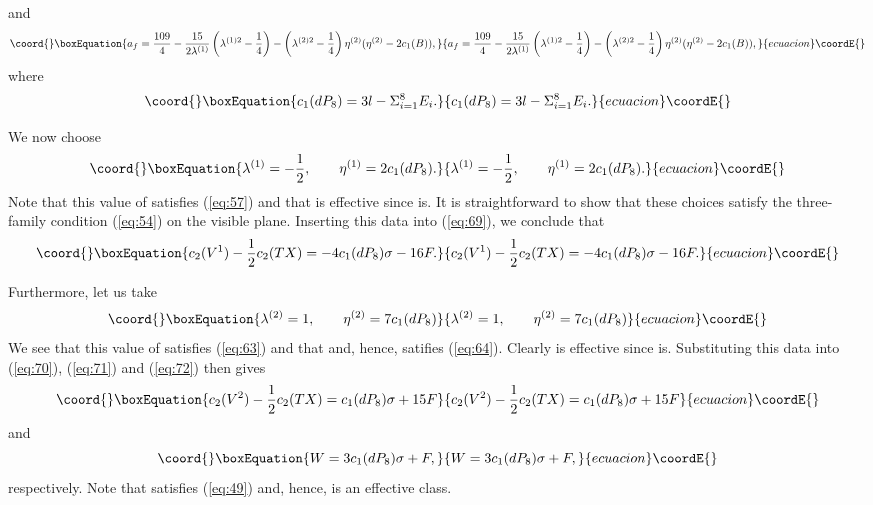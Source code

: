 \documentclass[a4paper,12pt]{article}
\numberwithin{equation}{section}
\theoremstyle{plain}
\begin{document}
%
and
%
\begin{equation}\coord{}\boxEquation{
a_{f}= \frac{109}{4}
-\frac{15}{2\lambda^{(1)}}\left(\lambda^{(1)2}-\frac{1}{4}\right)
-\left(\lambda^{(2)2}-\frac{1}{4}\right)\eta^{(2)}(\eta^{(2)}-2c_{1}(B)),
\label{eq:72}
}{
a_{f}= \frac{109}{4}
-\frac{15}{2\lambda^{(1)}}\left(\lambda^{(1)2}-\frac{1}{4}\right)
-\left(\lambda^{(2)2}-\frac{1}{4}\right)\eta^{(2)}(\eta^{(2)}-2c_{1}(B)),
}{ecuacion}\coordE{}\end{equation}
%
where
%
\begin{equation}\coord{}\boxEquation{
c_{1}(dP_{8})=3l-\Sigma_{i=1}^{8}E_{i}.
\label{eq:73}
}{
c_{1}(dP_{8})=3l-\Sigma_{i=1}^{8}E_{i}.
}{ecuacion}\coordE{}\end{equation}
%

We now choose
%
\begin{equation}\coord{}\boxEquation{
\lambda^{(1)}=-\frac{1}{2}, \qquad \eta^{(1)}=2c_{1}(dP_{8}).
\label{eq:74}
}{
\lambda^{(1)}=-\frac{1}{2}, \qquad \eta^{(1)}=2c_{1}(dP_{8}).
}{ecuacion}\coordE{}\end{equation}
%
Note that this value of \coordHE{} 
satisfies (\ref{eq:57}) and that
\coordHE{} is effective since \coordHE{} is. It is straightforward to
show that these choices satisfy the three-family condition (\ref{eq:54}) on
the visible plane. Inserting this data into (\ref{eq:69}), we conclude that
%
\begin{equation}\coord{}\boxEquation{
c_{2}(V^{1})-\frac{1}{2}c_{2}(TX)=-4c_{1}(dP_{8})\sigma-16F.
\label{eq:75}
}{
c_{2}(V^{1})-\frac{1}{2}c_{2}(TX)=-4c_{1}(dP_{8})\sigma-16F.
}{ecuacion}\coordE{}\end{equation}
%


Furthermore, let us take
%
\begin{equation}\coord{}\boxEquation{
\lambda^{(2)}=1, \qquad \eta^{(2)}=7c_{1}(dP_{8})
\label{eq:76}
}{
\lambda^{(2)}=1, \qquad \eta^{(2)}=7c_{1}(dP_{8})
}{ecuacion}\coordE{}\end{equation}
%
We see that this value of \coordHE{} satisfies (\ref{eq:63}) and that
\coordHE{} and, hence, satifies (\ref{eq:64}).
Clearly \coordHE{} is effective since \coordHE{} is. Substituting this
data into (\ref{eq:70}), (\ref{eq:71}) and (\ref{eq:72}) then gives
%
\begin{equation}\coord{}\boxEquation{
c_{2}(V^{2})-\frac{1}{2}c_{2}(TX)=c_{1}(dP_{8})\sigma+15F
\label{eq:77}
}{
c_{2}(V^{2})-\frac{1}{2}c_{2}(TX)=c_{1}(dP_{8})\sigma+15F
}{ecuacion}\coordE{}\end{equation}
%
and
%
\begin{equation}\coord{}\boxEquation{
W=3c_{1}(dP_{8})\sigma+F,
\label{eq:78}
}{
W=3c_{1}(dP_{8})\sigma+F,
}{ecuacion}\coordE{}\end{equation}
%
respectively. Note that \coordHE{} satisfies (\ref{eq:49}) and, hence, is an
effective class.
\end{document}
